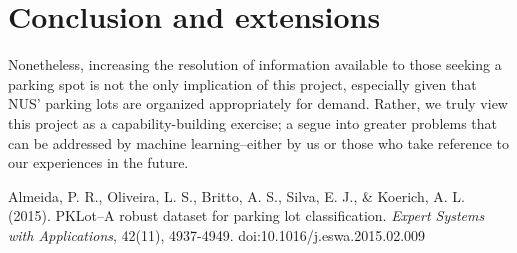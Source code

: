 \documentclass[a4paper, 11pt]{article} %
\begin{document}
\section{Conclusion and extensions}
Nonetheless, increasing the resolution of information available to 
those seeking a parking spot is not the only implication of this project, especially given that NUS' 
parking lots are organized appropriately for demand. Rather, we truly view this project as a 
capability-building exercise; a segue into greater problems that can be addressed by machine 
learning--either by us or those who take reference to our experiences in the future.

\newpage
\begin{thebibliography}{unsrt}
		Almeida, P. R., Oliveira, L. S., Britto, A. S., Silva, E. J., \& Koerich, A. L. (2015). PKLot--A robust 
		dataset for parking lot classification. \textit{Expert Systems with Applications}, 42(11), 
		4937-4949. doi:10.1016/j.eswa.2015.02.009
\end{thebibliography}
\end{document}
